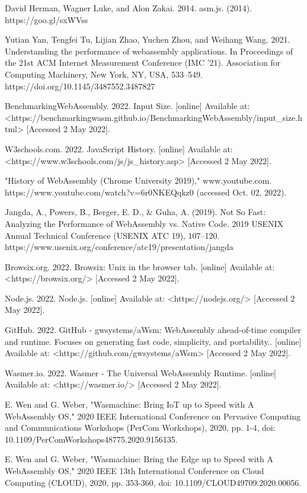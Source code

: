 \begin{thebibliography}{9}
David Herman, Wagner Luke, and Alon Zakai. 2014. asm.js. (2014). https://goo.gl/sxWVss

Yutian Yan, Tengfei Tu, Lijian Zhao, Yuchen Zhou, and Weihang Wang. 2021. Understanding the performance of webassembly applications. In Proceedings of the 21st ACM Internet Measurement Conference (IMC '21). Association for Computing Machinery, New York, NY, USA, 533–549. https://doi.org/10.1145/3487552.3487827

BenchmarkingWebAssembly. 2022. Input Size. [online] Available at: <https://benchmarkingwasm.github.io/BenchmarkingWebAssembly/input\_size.html> [Accessed 2 May 2022].

W3schools.com. 2022. JavaScript History. [online] Available at: <https://www.w3schools.com/js/js\_history.asp> [Accessed 2 May 2022].

"History of WebAssembly (Chrome University 2019)," www.youtube.com. https://www.youtube.com/watch?v=6r0NKEQqkz0 (accessed Oct. 02, 2022).

Jangda, A., Powers, B., Berger, E. D., \& Guha, A. (2019). Not So Fast: Analyzing the Performance of WebAssembly vs. Native Code. 2019 USENIX Annual Technical Conference (USENIX ATC 19), 107–120. https://www.usenix.org/conference/atc19/presentation/jangda

Browsix.org. 2022. Browsix: Unix in the browser tab. [online] Available at: <https://browsix.org/> [Accessed 2 May 2022].

Node.js. 2022. Node.js. [online] Available at: <https://nodejs.org/> [Accessed 2 May 2022].

GitHub. 2022. GitHub - gwsystems/aWsm: WebAssembly ahead-of-time compiler and runtime. Focuses on generating fast code, simplicity, and portability.. [online] Available at: <https://github.com/gwsystems/aWsm> [Accessed 2 May 2022].

Wasmer.io. 2022. Wasmer - The Universal WebAssembly Runtime. [online] Available at: <https://wasmer.io/> [Accessed 2 May 2022].

E. Wen and G. Weber, "Wasmachine: Bring IoT up to Speed with A WebAssembly OS," 2020 IEEE International Conference on Pervasive Computing and Communications Workshops (PerCom Workshops), 2020, pp. 1-4, doi: 10.1109/PerComWorkshops48775.2020.9156135.

E. Wen and G. Weber, "Wasmachine: Bring the Edge up to Speed with A WebAssembly OS," 2020 IEEE 13th International Conference on Cloud Computing (CLOUD), 2020, pp. 353-360, doi: 10.1109/CLOUD49709.2020.00056.


\end{thebibliography}
